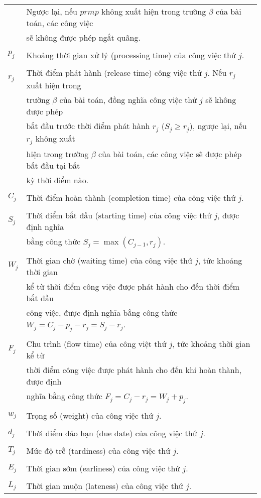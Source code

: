 \documentclass[12pt,a4paper]{report}
\begin{document}
\begin{longtable}{l l}
		& Ngược lại, nếu $prmp$ không xuất hiện trong trường $\beta$ của bài toán, các công việc \\
		& sẽ không được phép ngắt quãng. \\
		\\
		$p_j$ & Khoảng thời gian xử lý (processing time) của công việc thứ $j$. \\
		\\
		$r_j$ & Thời điểm phát hành (release time) công việc thứ $j$. Nếu $r_j$ xuất hiện trong \\
		& trường $\beta$ của bài toán, đồng nghĩa công việc thứ $j$ sẽ không được phép \\ 
		& bắt đầu trước thời điểm phát hành $r_j$ ($S_j \geq r_j$), ngược lại, nếu $r_j$ không xuất \\
		& hiện trong trường $\beta$ của bài toán, các công việc sẽ được phép bất đầu tại bất \\
		& kỳ thời điểm nào. \\
		\\
		$C_j$ & Thời điểm hoàn thành (completion time) của công việc thứ $j$. \\
		\\
		$S_j$ & Thời điểm bắt đầu (starting time) của công việc thứ $j$, được định nghĩa \\
		& bằng công thức $S_j = \max (C_{j-1}, r_j)$. \\
		\\
		$W_j$ & Thời gian chờ (waiting time) của công việc thứ $j$, tức khoảng thời gian \\
		& kể từ thời điểm công việc được phát hành cho đến thời điểm bắt đầu \\
		& công việc, được định nghĩa bằng công thức $W_j = C_j - p_j - r_j = S_j - r_j$. \\
		\\
		$F_j$ & Chu trình (flow time) của công việt thứ $j$, tức khoảng thời gian kể từ \\
		& thời điểm công việc được phát hành cho đến khi hoàn thành, được định \\
		& nghĩa bằng công thức $F_j = C_j - r_j = W_j + p_j$. \\
		\\
		$w_j$ & Trọng số (weight) của công việc thứ $j$. \\
		\\
		$d_j$ & Thời điểm đáo hạn (due date) của công việc thứ $j$. \\
		\\
		$T_j$ & Mức độ trễ (tardiness) của công việc thứ $j$. \\
		\\
		$E_j$ & Thời gian sớm (earliness) của công việc thứ $j$. \\
		\\
		$L_j$ & Thời gian muộn (lateness) của công việc thứ $j$. \\
	\end{longtable}
\newpage
\end{document}
